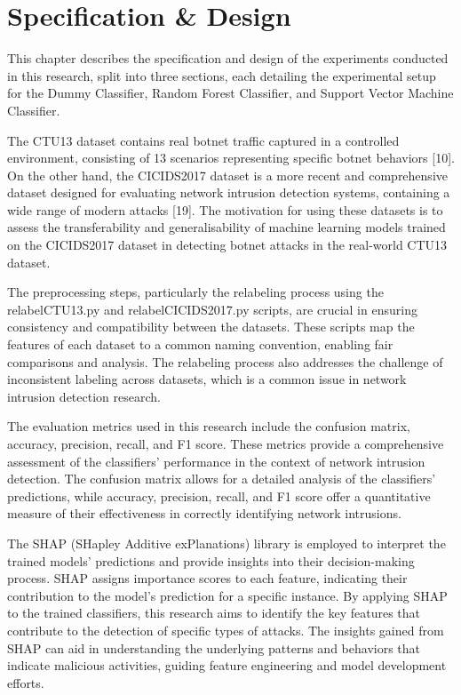 \chapter{Specification \& Design}

This chapter describes the specification and design of the experiments conducted in this research, split into three sections, each detailing the experimental setup for the Dummy Classifier, Random Forest Classifier, and Support Vector Machine Classifier.

The CTU13 dataset contains real botnet traffic captured in a controlled environment, consisting of 13 scenarios representing specific botnet behaviors [10]. On the other hand, the CICIDS2017 dataset is a more recent and comprehensive dataset designed for evaluating network intrusion detection systems, containing a wide range of modern attacks [19]. The motivation for using these datasets is to assess the transferability and generalisability of machine learning models trained on the CICIDS2017 dataset in detecting botnet attacks in the real-world CTU13 dataset.

The preprocessing steps, particularly the relabeling process using the relabelCTU13.py and relabelCICIDS2017.py scripts, are crucial in ensuring consistency and compatibility between the datasets. These scripts map the features of each dataset to a common naming convention, enabling fair comparisons and analysis. The relabeling process also addresses the challenge of inconsistent labeling across datasets, which is a common issue in network intrusion detection research.

The evaluation metrics used in this research include the confusion matrix, accuracy, precision, recall, and F1 score. These metrics provide a comprehensive assessment of the classifiers' performance in the context of network intrusion detection. The confusion matrix allows for a detailed analysis of the classifiers' predictions, while accuracy, precision, recall, and F1 score offer a quantitative measure of their effectiveness in correctly identifying network intrusions.

The SHAP (SHapley Additive exPlanations) library is employed to interpret the trained models' predictions and provide insights into their decision-making process. SHAP assigns importance scores to each feature, indicating their contribution to the model's prediction for a specific instance. By applying SHAP to the trained classifiers, this research aims to identify the key features that contribute to the detection of specific types of attacks. The insights gained from SHAP can aid in understanding the underlying patterns and behaviors that indicate malicious activities, guiding feature engineering and model development efforts.

